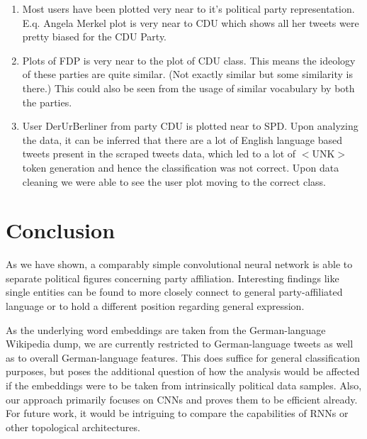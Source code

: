 \documentclass[10pt, oneside]{article}
\begin{document}
\begin{multicols}{2}
\begin{enumerate}
	\item Most users have been plotted very near to it’s political party representation. E.q. Angela Merkel plot is very near to CDU which shows all her tweets were pretty biased for the CDU Party.
	\item Plots of FDP is very near to the plot of CDU class. This means the ideology of these parties are quite similar. (Not exactly similar but some similarity is there.) This could also be seen from the usage of similar vocabulary by both the parties.
	\item User DerUrBerliner from party CDU is plotted near to SPD. Upon analyzing the data, it can be inferred that there are a lot of English language based tweets present in the scraped tweets data, which led to a lot of $<$UNK$>$ token generation and hence the classification was not correct. Upon data cleaning we were able to see the user plot moving to the correct class. 
\end{enumerate}


\section{Conclusion}

As we have shown, a comparably simple convolutional neural network is able to separate political figures concerning party affiliation. Interesting findings like single entities can be found to more closely connect to general party-affiliated language or to hold a different position regarding general expression.

As the underlying word embeddings are taken from the German-language Wikipedia dump, we are currently restricted to German-language tweets as well as to overall German-language features. This does suffice for general classification purposes, but poses the additional question of how the analysis would be affected if the embeddings were to be taken from intrinsically political data samples. 
Also, our approach primarily focuses on CNNs and proves them to be efficient already. For future work, it would be intriguing to compare the capabilities of RNNs or other topological architectures. 


\end{multicols}



\end{document}
